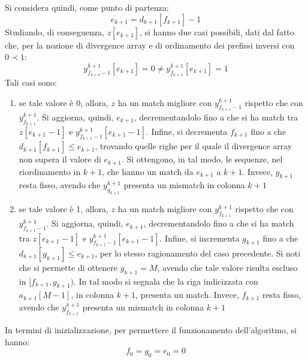 \begin{enumerate}
  Si considera quindi, come punto di partenza:
  \begin{equation}
    \label{eq:pbwtsmem3}
    e_{k+1}=d_{k+1}[f_{k+1}]-1
  \end{equation}
  Studiando, di conseguenza, $z[e_{k+1}]$, si hanno due casi possibili, dati dal
  fatto che, per la nozione di divergence array e di ordinamento dei
  prefissi inversi con $0\prec 1$:
  \begin{equation}
    \label{eq:pbwtsmem4}
    y_{f_{k+1}-1}^{k+1}[e_{k+1}]=0\neq y_{f_{k+1}}^{k+1}[e_{k+1}]=1
  \end{equation}
  Tali casi sono:
  \begin{enumerate}
    \item se tale valore è 0, allora, $z$ ha un match migliore
    con $y_{f_{k+1}-1}^{k+1}$ rispetto che con $y_{f_{k+1}}^{k+1}$. Si aggiorna,
    quindi, $e_{k+1}$, decrementandolo fino a che si ha match tra $z[e_{k+1}-1]$
    e $y_{f_{k+1}-1}^{k+1}[e_{k+1}-1]$. Infine, si decrementa $f_{k+1}$ fino a
    che $d_{k+1}[f_{k+1}]\leq e_{k+1}$, trovando quelle righe per il quale il
    divergence array non supera il valore di $e_{k+1}$. Si ottengono, in
    tal modo, le sequenze, nel riordinamento in $k+1$, che hanno un match da
    $e_{k+1}$ a $k+1$. Invece, $g_{k+1}$ resta fisso, avendo che
    $y_{g_{k+1}}^{k+1}$ presenta un
    mismatch in colonna $k+1$
    \item se tale valore è 1, allora, $z$ ha un match migliore
    con $y_{f_{k+1}}^{k+1}$ rispetto che con $y_{f_{k+1}-1}^{k+1}$. Si aggiorna,
    quindi, $e_{k+1}$, decrementandolo fino a che si ha match tra $z[e_{k+1}-1]$
    e $y_{f_{k+1}-1}^{k+1}[e_{k+1}-1]$. Infine, si incrementa $g_{k+1}$ fino a
    che $d_{k+1}[g_{k+1}]\leq e_{k+1}$, per lo stesso ragionamento del caso
    precedente. Si noti che si permette di ottenere $g_{k+1}=M$, avendo che tale
    valore risulta escluso in $[f_{k+1},g_{k+1})$. In tal modo si segnala che la
    riga indicizzata con $a_{k+1}[M-1]$, in colonna $k+1$, presenta un
    match. Invece, $f_{k+1}$ resta fisso, avendo che $y_{f_{k+1}}^{k+1}$ 
    presenta un mismatch in colonna $k+1$ 
  \end{enumerate}
\end{enumerate}
In termini di inizializzazione, per permettere il funzionamento dell'algoritmo,
si hanno: 
\[f_0=g_0=e_0=0\]

